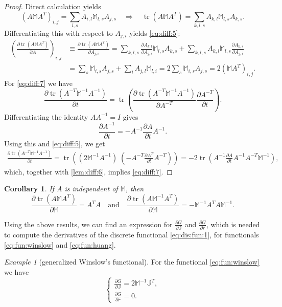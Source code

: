 \documentclass[american]{scrartcl}
\providecommand{\p}[2]{\frac{\partial{}#1}{\partial{}#2}}
\providecommand{\M}{\mathbb{M}}
\providecommand{\J}{\mathbb{J}}
\newtheorem{corollary}{\hspace{1ex}Corollary}[section]
\theoremstyle{remark}
\newtheorem{example}{\hspace{1ex}Example}[section]
\begin{document}
\begin{proof}
Direct calculation yields
\[
   {(A \M A^T)}_{i,j} = \sum_{l, s} A_{i, l} \M_{l, s} A_{j, s}
   \quad \Longrightarrow \quad
   \operatorname{tr}(A \M A^T) = \sum_{k, l, s} A_{k, l} \M_{l, s} A_{k, s} .
\]
Differentiating this with respect to $A_{j,i}$ yields \cref{eq:diff:5}:
\begin{align*}
   {\left( \p{\operatorname{tr}(A \M A^T)}{A} \right)}_{i,j}
      &\equiv \p{\operatorname{tr}(A \M A^T)}{A_{j,i}}
      = \sum_{k, l, s} \p{A_{k, l}}{A_{j,i}} \M_{l, s} A_{k, s}
         + \sum_{k, l, s} A_{k, l} \M_{l, s} \p{A_{k, s}}{A_{j,i}}
   \\
      & = \sum_{s} \M_{i, s} A_{j, s} + \sum_{l} A_{j, l} \M_{l, i}
      = 2 \sum_{s} \M_{i, s} A_{j, s}
      = 2 {(\M A^T)}_{i,j}
      .
\end{align*}
For \cref{eq:diff:7} we have
\[
   \p{\operatorname{tr}(A^{-T} \M^{-1} A^{-1})}{t}
      = \operatorname{tr}\left( \p{\operatorname{tr}(A^{-T} \M^{-1} A^{-1})}{A^{-T}} \p{A^{-T}}{t} \right)
   .
\]
Differentiating the identity $A A^{-1} = I$ gives
\begin{equation}
   \p{A^{-1}}{t} = - A^{-1} \p{A}{t} A^{-1}
   .
   \label{eq:inverse:1}
\end{equation}
Using this and \cref{eq:diff:5}, we get
\begin{align*}
   \p{\operatorname{tr}(A^{-T} \M^{-1} A^{-1})}{t}
   = \operatorname{tr}\left( (2 \M^{-1} A^{-1}) \; (- A^{-T} \p{A^T}{t}A^{-T}) \right)
   = - 2 \operatorname{tr}\left( A^{-1}  \p{A}{t} A^{-1} A^{-T} \M^{-1} \right)
   ,
\end{align*}
which, together with \cref{lem:diff:6}, implies \cref{eq:diff:7}.
\end{proof}

\begin{corollary}
\label{cor-1}
If $A$ is independent of $\M$, then
\[
   \p{\operatorname{tr} (A \M A^T)}{\M} = A^T A
   \quad \text{and} \quad
   \p{\operatorname{tr} (A \M^{-1} A^T)}{\M} = - \M^{-1} A^T A \M^{-1}
   .
\]
\end{corollary}

Using the above results, we can find an expression for $\p{G}{\J}$ and $\p{G}{r}$, which is needed to compute the derivatives of the discrete functional \cref{eq:dis:fun:1}, for functionals \cref{eq:fun:winslow} and \cref{eq:fun:huang}.

\begin{example}[generalized Winslow's functional]
\label{ex:winslow:2}
   For the functional \cref{eq:fun:winslow} we have
\begin{equation}
   \begin{cases}
      \p{G}{\J} = 2 \M^{-1} \J^T,
      \\
      \p{G}{r} = 0 .
   \end{cases}
   \label{eq:winslow:2}
\end{equation}
\end{example}
\end{document}
